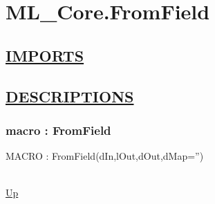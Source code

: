 \chapter*{ML\_Core.FromField}
\hypertarget{ML_Core.FromField}{}

\section*{\underline{IMPORTS}}

\section*{\underline{DESCRIPTIONS}}
\subsection*{macro : FromField}
\hypertarget{ecldoc:ml_core.fromfield}{MACRO : FromField(dIn,lOut,dOut,dMap='')} \\
\hyperlink{ecldoc:}{Up} \\
\par

